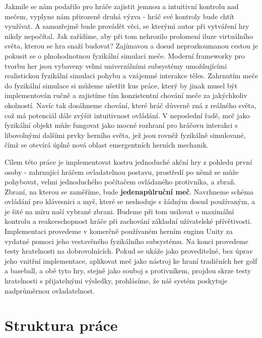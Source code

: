 Jakmile se nám podařilo pro hráče zajistit jemnou a intuitivní kontrolu nad mečem, vyplyne nám přirozeně druhá výzva - hráč své kontroly bude chtít využívat. A samozřejmě bude provádět věci, se kterými autor při vytváření hry nikdy nepočítal. Jak zařídíme, aby při tom nehrozilo prolomení iluze virtuálního světa, kterou se hra snaží budovat? Zajímavou a dosud neprozkoumanou cestou je pokusit se o plnohodnotnou fyzikální simulaci meče. Moderní frameworky pro tvorbu her jsou vybaveny velmi univerzálními subsystémy umožňujícími realistickou fyzikální simulaci pohybu a vzájemné interakce těles. Zahrnutím meče do fyzikální simulace si můžeme ušetřit kus práce, který by jinak musel být implementován ručně a zajistíme tím konzistentní chování meče za jakýchkoliv okolností. Navíc tak dosáhneme chování, které hráč důverně zná z reálného světa, což má potenciál dále zvýšit intuitivnost ovládání. V neposlední řadě, meč jako fyzikální objekt může fungovat jako mocné rozhraní pro hráčovu interakci s libovolnými dalšími prvky herního světa, jež jsou rovněž fyzikálně simulované, čímž se otevírá úplně nová oblast emergentních herních mechanik. 

Cílem této práce je implementovat kostru jednoduché akční hry z pohledu první osoby - zahrnující hráčem ovladatelnou postavu, prostředí po němž se může pohybovat, velmi jednoduchého počítačem ovládaného protivníka, a zbraň. Zbraní, na kterou se zaměříme, bude \textbf{jedenapůlruční meč}. Navrhneme schéma ovládání pro klávesnici a myš, které se neshoduje s žádným dosud používaným, a je šité na míru naší vybrané zbrani. Budeme při tom usilovat o maximální kontrolu a reakceschopnost hráče při zachování základní uživatelské přívětivosti. Implementaci provedeme v komerčně používaném herním enginu Unity za vydatné pomoci jeho vestavěného fyzikálního subsystému. Na konci provedeme testy hratelnosti na dobrovolnících. Pokud se ukáže jako proveditelné, bez úprav jeho vnitřní implementace, aplikovat meč jako nástroj ke hraní tradičních her golf a baseball, a obě tyto hry, stejně jako souboj s protivníkem, projdou skrze testy hratelnosti s přijatelnými výsledky, prohlásíme, že náš systém poskytuje nadprůměrnou ovladatelnost.

\section*{Struktura práce}

